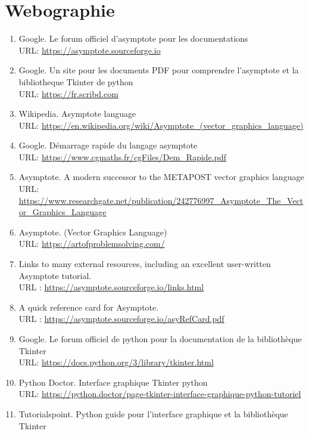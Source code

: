 \documentclass[a4paper]{report}
\newcommand{\link}[1]{{\color{blue}\href{#1}{#1}}}
\begin{document}
\chapter*{Webographie}
\begin{enumerate}
    \item Google. Le forum officiel d'asymptote pour les documentations\\
    URL: \link{https://asymptote.sourceforge.io}
    \item Google. Un site pour les documents PDF pour comprendre l'asymptote et la bibliotheque Tkinter de python\\
    URL: \link{https://fr.scribd.com}
    \item Wikipedia. Asymptote language\\
    URL: \link{https://en.wikipedia.org/wiki/Asymptote_(vector_graphics_language)}
    \item Google. Démarrage rapide du langage asymptote\\
    URL: \link{https://www.cgmaths.fr/cgFiles/Dem_Rapide.pdf}
    \item Asymptote. A modern successor to the METAPOST vector graphics language\\
    URL: \link{https://www.researchgate.net/publication/242776997_Asymptote_The_Vector_Graphics_Language}
    \item Asymptote. (Vector Graphics Language)\\
    URL: \link{https://artofproblemsolving.com/}
    \item Links to many external resources, including an excellent user-written Asymptote tutorial.\\
    URL : \link{https://asymptote.sourceforge.io/links.html}
    \item A quick reference card for Asymptote.\\
    URL : \link{https://asymptote.sourceforge.io/asyRefCard.pdf}
    \item Google. Le forum officiel de python pour la documentation de la bibliothèque Tkinter\\
    URL: \link{https://docs.python.org/3/library/tkinter.html}
    \item Python Doctor. Interface graphique Tkinter python\\
    URL: \link{https://python.doctor/page-tkinter-interface-graphique-python-tutoriel}
    \item Tutorialspoint. Python guide pour l'interface graphique et la bibliothèque Tkinter \\

\end{enumerate}
\end{document}

